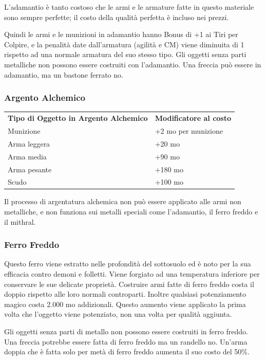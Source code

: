 \documentclass[a4paper,11pt,twoside,openany]{book}
\begin{document}
{L'adamantio è tanto costoso che le armi e le armature fatte in questo materiale sono sempre perfette; il costo della qualità perfetta è incluso nei prezzi.

Quindi le armi e le munizioni in adamantio hanno Bonus di +1 ai Tiri per Colpire, e la penalità date dall'armatura (agilità e CM) viene diminuita di 1 rispetto ad una normale armatura del suo stesso tipo. Gli oggetti senza parti metalliche non possono essere costruiti con l'adamantio. Una freccia può essere in adamantio, ma un bastone ferrato
no.

\subsubsection{Argento Alchemico}

\label{argento-alchemico}

\begin{tabular}{ll}
\toprule
\textbf{Tipo di Oggetto in Argento Alchemico} & \textbf{Modificatore al costo}\tabularnewline
Munizione & +2 mo per munizione\tabularnewline
Arma leggera & +20 mo\tabularnewline
Arma media & +90 mo\tabularnewline
Arma pesante & +180 mo\tabularnewline
Scudo & +100 mo\tabularnewline
\end{tabular}

Il processo di argentatura alchemica non può essere applicato alle armi non metalliche, e non funziona sui metalli speciali come l'adamantio, il ferro freddo e il mithral.

\subsubsection{Ferro Freddo}

\label{ferro-freddo}

Questo ferro viene estratto nelle profondità del sottosuolo ed è noto per la sua efficacia contro demoni e folletti. Viene forgiato ad una temperatura inferiore per conservare le sue delicate proprietà. Costruire armi fatte di ferro freddo costa il doppio rispetto alle loro normali controparti. Inoltre qualsiasi potenziamento magico costa 2.000 mo addizionali. Questo aumento viene applicato la prima volta che l'oggetto viene potenziato, non una volta per qualità aggiunta. 

Gli oggetti senza parti di metallo non possono essere costruiti in ferro freddo. Una freccia potrebbe essere fatta di ferro freddo ma un randello no. Un'arma doppia che è fatta solo per metà di ferro freddo aumenta il suo costo del 50\%.

}
\end{document}
